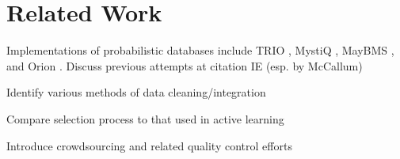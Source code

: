 \section{Related Work}
Implementations of probabilistic databases include TRIO \cite{DBLP:conf/vldb/AgrawalBSHNSW06}, MystiQ \cite{Boulos:2005:MSF:1066157.1066277}, MayBMS \cite{Huang09maybms:a}, and Orion \cite{DBLP:conf/comad/SinghMMPHS08}.
Discuss previous attempts at citation IE (esp. by McCallum) \newline

\noindent Identify various methods of data cleaning/integration \newline

\noindent Compare selection process to that used in active learning \newline

\noindent Introduce crowdsourcing and related quality control efforts
